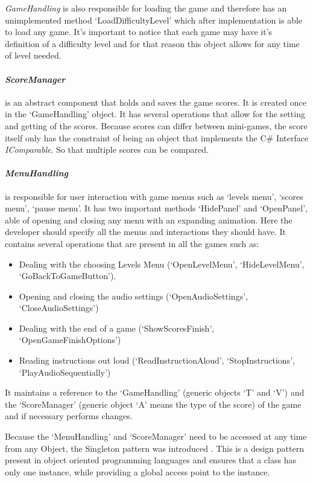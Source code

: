 \textit{GameHandling} is also responsible for loading the game and therefore has an unimplemented method `LoadDifficultyLevel' which after implementation is able to load any game. It's important to notice that each game may have it's definition of a difficulty level and for that reason this object allows for any time of level needed.

\paragraph{\textit{ScoreManager}} is an abstract component that holds and saves the game scores. It is created once in the `GameHandling' object. It has several operations that allow for the setting and getting of the scores. Because scores can differ between mini-games, the score itself only has the constraint of being an object that implements the C\# Interface \textit{IComparable}. So that multiple scores can be compared.

\paragraph{\textit{MenuHandling}} is responsible for user interaction with game menus such as `levels menu', `scores menu', `pause menu'. It has two important methods `HidePanel' and `OpenPanel', able of opening and closing any menu with an expanding animation. Here the developer should specify all the menus and interactions they should have. It contains several operations that are present in all the games such as:

\begin{itemize}
    \item Dealing with the choosing Levels Menu (`OpenLevelMenu', `HideLevelMenu', `GoBackToGameButton').
    \item Opening and closing the audio settings (`OpenAudioSettings', `CloseAudioSettings')
    \item Dealing with the end of a game (`ShowScoresFinish', `OpenGameFinishOptions')
    \item Reading instructions out loud (`ReadInstructionAloud', `StopInstructions', `PlayAudioSequentially')
\end{itemize}

It maintains a reference to the `GameHandling' (generic objects `T' and `V') and the `ScoreManager' (generic object `A' means the type of the score) of the game and if necessary performs changes.

Because the `MenuHandling' and `ScoreManager' need to be accessed at any time from any Object, the Singleton pattern was introduced \cite{singleton}. This is a design pattern present in object oriented programming languages and ensures that a class has only one instance, while providing a global access point to the instance.

